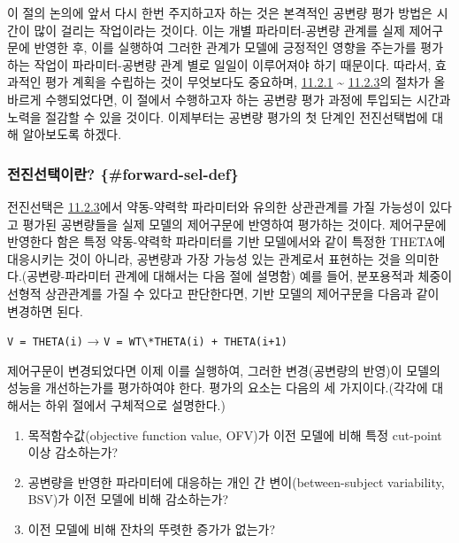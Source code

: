 \documentclass[
  10pt,
  krantz2,
  a4paper]{krantz}
\providecommand{\tightlist}{%
  \setlength{\itemsep}{0pt}\setlength{\parskip}{0pt}}
\theoremstyle{definition}
\theoremstyle{definition}
\theoremstyle{definition}
\theoremstyle{remark}
\begin{document}
이 절의 논의에 앞서 다시 한번 주지하고자 하는 것은 본격적인 공변량 평가 방법은 시간이 많이 걸리는 작업이라는 것이다. 이는 개별 파라미터-공변량 관계를 실제 제어구문에 반영한 후, 이를 실행하여 그러한 관계가 모델에 긍정적인 영향을 주는가를 평가하는 작업이 파라미터-공변량 관계 별로 일일이 이루어져야 하기 때문이다. 따라서, 효과적인 평가 계획을 수립하는 것이 무엇보다도 중요하며, \protect\hyperlink{variable-eval}{11.2.1} \textasciitilde{} \protect\hyperlink{colinearity}{11.2.3}의 절차가 올바르게 수행되었다면, 이 절에서 수행하고자 하는 공변량 평가 과정에 투입되는 시간과 노력을 절감할 수 있을 것이다. 이제부터는 공변량 평가의 첫 단계인 전진선택법에 대해 알아보도록 하겠다.

\hypertarget{uxc804uxc9c4uxc120uxd0dduxc774uxb780-forward-sel-def}{%
\subsubsection{\texorpdfstring{전진선택이란? \{\#forward-sel-def\}}{전진선택이란? \{\#forward-sel-def\}}}\label{uxc804uxc9c4uxc120uxd0dduxc774uxb780-forward-sel-def}}

전진선택은 \protect\hyperlink{colinearity}{11.2.3}에서 약동-약력학 파라미터와 유의한 상관관계를 가질 가능성이 있다고 평가된 공변량들을 실제 모델의 제어구문에 반영하여 평가하는 것이다. 제어구문에 반영한다 함은 특정 약동-약력학 파라미터를 기반 모델에서와 같이 특정한 THETA에 대응시키는 것이 아니라, 공변량과 가장 가능성 있는 관계로서 표현하는 것을 의미한다.(공변량-파라미터 관계에 대해서는 다음 절에 설명함) 예를 들어, 분포용적과 체중이 선형적 상관관계를 가질 수 있다고 판단한다면, 기반 모델의 제어구문을 다음과 같이 변경하면 된다.

\texttt{V\ =\ THETA(i)} → \texttt{V\ =\ WT\textbackslash{}*THETA(i)\ +\ THETA(i+1)}

제어구문이 변경되었다면 이제 이를 실행하여, 그러한 변경(공변량의 반영)이 모델의 성능을 개선하는가를 평가하여야 한다. 평가의 요소는 다음의 세 가지이다.(각각에 대해서는 하위 절에서 구체적으로 설명한다.)

\begin{enumerate}
\def\labelenumi{\arabic{enumi}.}
\tightlist
\item
  목적함수값(objective function value, OFV)가 이전 모델에 비해 특정 cut-point 이상 감소하는가?
\item
  공변량을 반영한 파라미터에 대응하는 개인 간 변이(between-subject variability, BSV)가 이전 모델에 비해 감소하는가?
\item
  이전 모델에 비해 잔차의 뚜렷한 증가가 없는가?
\end{enumerate}
\end{document}
